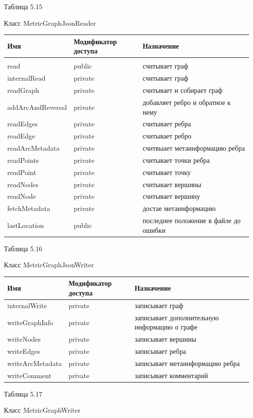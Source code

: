 \documentclass{../TechDoc}
\begin{document}
	\begin{flushright}
		Таблица 5.15
	\end{flushright}
	Класс MetricGraphJsonReader
	
	\begin{tabular}{|p{5cm}|p{5cm}|p{5cm}|}
		\hline
		\textbf{Имя} & \textbf{Модификатор доступа} & \textbf{Назначение} \\
		\hline& & \\
		\hline
		read & public & считывает граф \\
		\hline
		internalRead& private & считывает граф\\
		\hline
		readGraph&private & считывает и собирает граф\\
		\hline
		addArcAndReversal&private & добавляет ребро и обратное к нему\\
		\hline
		readEdges&private & считывает ребра\\
		\hline
		readEdge&private & считывает ребро\\
		\hline
		readArcMetadata&private & считвыает метаинформацию ребра\\
		\hline
		readPoints& private& считывает точки ребра\\
		\hline
		readPoint&private & считывает точку\\
		\hline
		readNodes&private & считывает вершины\\
		\hline
		readNode& private& считывает вершину\\
		\hline
		fetchMetadata& private& достае метаинформацию\\
		\hline
		lastLocation& public & последнее положение в файле до ошибки\\
		
		\hline
	\end{tabular}
	\begin{flushright}
		Таблица 5.16
	\end{flushright}
	Класс MetricGraphJsonWriter
	
	\begin{tabular}{|p{5cm}|p{5cm}|p{5cm}|}
		\hline
		\textbf{Имя} & \textbf{Модификатор доступа} & \textbf{Назначение} \\
		\hline
		internalWrite& private & записывает граф\\
		\hline
		writeGraphInfo& private& записывает дополнительную информацию о графе\\
		\hline
		writeNodes&private & записывает вершины\\
		\hline
		writeEdges& private& записывает ребра\\
		\hline
		writeArcMetadata&private & записывает метаинформацию ребра\\
		\hline
		writeComment&private & записывает комментарий\\
		
		\hline
	\end{tabular}
	\begin{flushright}
		Таблица 5.17
	\end{flushright}
	Класс MetricGraphWriter
	
\end{document}
